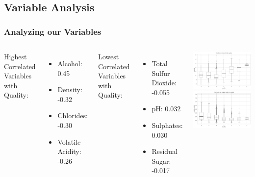 \documentclass{beamer}
\begin{document}
	\subsection{Variable Analysis}
	\begin{frame}
		\frametitle{ Analyzing our Variables }
			\begin{columns}
				Highest Correlated Variables with Quality:
				\begin{itemize}
					\item Alcohol:  0.45
					\item Density:  -0.32
					\item Chlorides:  -0.30
					\item Volatile Acidity:  -0.26
				\end{itemize}
			Lowest Correlated Variables with Quality:
			\begin{itemize}
				\item Total Sulfur Dioxide:  -0.055
				\item pH:  0.032
				\item Sulphates:  0.030
				\item Residual Sugar:  -0.017
			\end{itemize}
				\includegraphics[height=.45\textheight]{images/alcohol vs quality.png} 
				\includegraphics[height=.45\textheight]{images/VA vs quality.png} 
			\end{columns}
		
	\end{frame}
	
\end{document}
